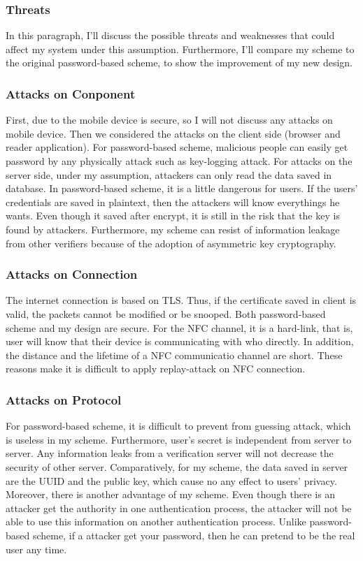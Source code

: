 \begin{CJK}{Bg5}{bsmi}
\subsubsection{Threats}

In this paragraph, I'll discuss the possible threats and weaknesses that could affect my system under this assumption. Furthermore, I'll compare my scheme to the original password-based scheme, to show the improvement of my new design.

\subsubsection{Attacks on Conponent}

First, due to the mobile device is secure, so I will not discuss any attacks on mobile device. Then we considered the attacks on the client side (browser and reader application). For password-based scheme, malicious people can easily get password by any physically attack such as key-logging attack. For attacks on the server side, under my assumption, attackers can only read the data saved in database. In password-based scheme, it is a little dangerous for users. If the users' credentials are saved in plaintext, then the attackers will know everythings he wants. Even though it saved after encrypt, it is still in the risk that the key is found by attackers. Furthermore, my scheme can resist of information leakage from other verifiers because of the adoption of asymmetric key cryptography.

\subsubsection{Attacks on Connection}

The internet connection is based on TLS. Thus, if the certificate saved in client is valid, the packets cannot be modified or be snooped. Both password-based scheme and my design are secure. For the NFC channel, it is a hard-link, that is, user will know that their device is communicating with who directly. In addition, the distance and the lifetime of a NFC communicatio channel are short. These reasons make it is difficult to apply replay-attack on NFC connection. 

\subsubsection{Attacks on Protocol}

For password-based scheme, it is difficult to prevent from guessing attack, which is useless in my scheme. Furthermore, user's secret is independent from server to server. Any information leaks from a verification server will not decrease the security of other server. Comparatively, for my scheme, the data saved in server are the UUID and the public key, which cause no any effect to users' privacy. Moreover, there is another advantage of my scheme. Even though there is an attacker get the authority in one authentication process, the attacker will not be able to use this information on another authentication process. Unlike password-based scheme, if a attacker get your password, then he can pretend to be the real user any time.


\end{CJK}
